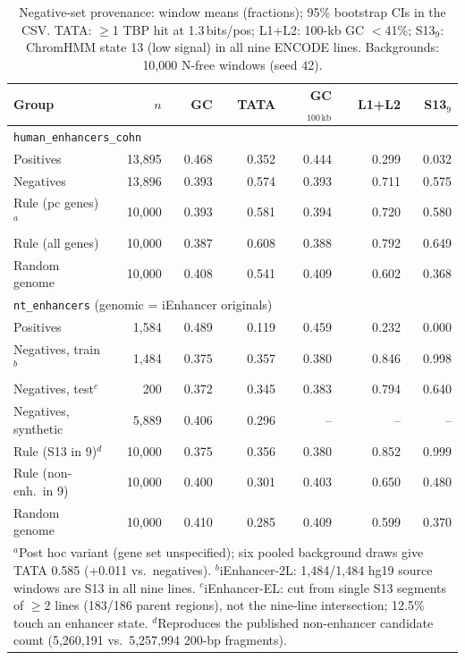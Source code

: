 \begin{table}[t]\centering\scriptsize\setlength{\tabcolsep}{2pt}
\caption{Negative-set provenance: window means (fractions); 95\% bootstrap CIs in the CSV. TATA: $\ge$1 TBP hit at 1.3\,bits/pos; L1+L2: 100-kb GC $<$41\%; S13$_9$: ChromHMM state 13 (low signal) in all nine ENCODE lines. Backgrounds: 10,000 N-free windows (seed 42).}\label{tab:prov}
\begin{tabular}{lrrrrrr}\toprule
Group & $n$ & GC & TATA & GC$_{100\,\mathrm{kb}}$ & L1+L2 & S13$_{9}$\\\midrule
\multicolumn{7}{l}{\texttt{human\_enhancers\_cohn}}\\
\quad Positives & 13,895 & 0.468 & 0.352 & 0.444 & 0.299 & 0.032\\
\quad Negatives & 13,896 & 0.393 & 0.574 & 0.393 & 0.711 & 0.575\\
\quad Rule (pc genes)$^a$ & 10,000 & 0.393 & 0.581 & 0.394 & 0.720 & 0.580\\
\quad Rule (all genes) & 10,000 & 0.387 & 0.608 & 0.388 & 0.792 & 0.649\\
\quad Random genome & 10,000 & 0.408 & 0.541 & 0.409 & 0.602 & 0.368\\
\midrule\multicolumn{7}{l}{\texttt{nt\_enhancers} (genomic = iEnhancer originals)}\\
\quad Positives & 1,584 & 0.489 & 0.119 & 0.459 & 0.232 & 0.000\\
\quad Negatives, train$^b$ & 1,484 & 0.375 & 0.357 & 0.380 & 0.846 & 0.998\\
\quad Negatives, test$^c$ & 200 & 0.372 & 0.345 & 0.383 & 0.794 & 0.640\\
\quad Negatives, synthetic & 5,889 & 0.406 & 0.296 & -- & -- & --\\
\quad Rule (S13 in 9)$^d$ & 10,000 & 0.375 & 0.356 & 0.380 & 0.852 & 0.999\\
\quad Rule (non-enh.\ in 9) & 10,000 & 0.400 & 0.301 & 0.403 & 0.650 & 0.480\\
\quad Random genome & 10,000 & 0.410 & 0.285 & 0.409 & 0.599 & 0.370\\
\bottomrule
\multicolumn{7}{p{0.96\columnwidth}}{$^a$Post hoc variant (gene set unspecified); six pooled background draws give TATA 0.585 (+0.011 vs.\ negatives). $^b$iEnhancer-2L: 1,484/1,484 hg19 source windows are S13 in all nine lines. $^c$iEnhancer-EL: cut from single S13 segments of $\ge$2 lines (183/186 parent regions), not the nine-line intersection; 12.5\% touch an enhancer state. $^d$Reproduces the published non-enhancer candidate count (5,260,191 vs.\ 5,257,994 200-bp fragments).}\\
\end{tabular}
\end{table}
